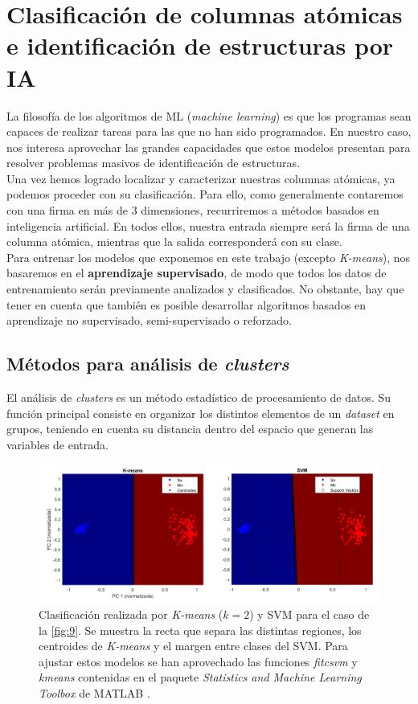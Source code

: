 \section{Clasificación de columnas atómicas e identificación de estructuras por IA}

La filosofía de los algoritmos de ML (\textit{machine learning}) es que los programas sean capaces de realizar tareas para las que no han sido programados. En nuestro caso, nos interesa aprovechar las grandes capacidades que estos modelos presentan para resolver problemas masivos de identificación de estructuras.\\

Una vez hemos logrado localizar y caracterizar nuestras columnas atómicas, ya podemos proceder con su clasificación. Para ello, como generalmente contaremos con una firma en más de 3 dimensiones, recurriremos a métodos basados en inteligencia artificial. En todos ellos, nuestra entrada siempre será la firma de una columna atómica, mientras que la salida corresponderá con su clase.\\

Para entrenar los modelos que exponemos en este trabajo (excepto \textit{K-means}), nos basaremos en el \textbf{aprendizaje supervisado}, de modo que todos los datos de entrenamiento serán previamente analizados y clasificados. No obstante, hay que tener en cuenta que también es posible desarrollar algoritmos basados en aprendizaje no supervisado, semi-supervisado o reforzado.\\

\subsection{Métodos para análisis de \textit{clusters}}
El análisis de \textit{clusters} es un método estadístico de procesamiento de datos. Su función principal consiste en organizar los distintos elementos de un \textit{dataset} en grupos, teniendo en cuenta su distancia dentro del espacio que generan las variables de entrada.\\

\begin{figure}[h!]
    \centering
    \includegraphics[width=1\textwidth]{fig/Fig12.png}
    \caption{Clasificación realizada por \textit{K-means} ($k=2$) y SVM para el caso de la \autoref{fig:9}. Se muestra la recta que separa las distintas regiones, los centroides de \textit{K-means} y el margen entre clases del SVM. Para ajustar estos modelos se han aprovechado las funciones \textit{fitcsvm} y \textit{kmeans} contenidas en el paquete \textit{Statistics and Machine Learning Toolbox} de MATLAB \cite{repo}.}
    \label{fig:12}
\end{figure}

